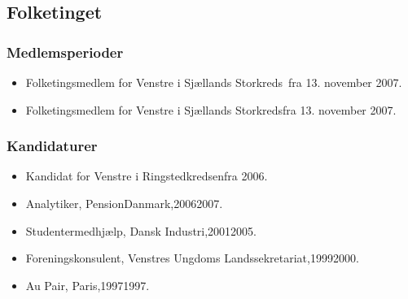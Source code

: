 \documentclass[11pt, a4paper]{awesome-cv}
\begin{document}
\begin{cvletter}
\subsection*{Folketinget}
\subsubsection*{Medlemsperioder}
\begin{itemize}
\item Folketingsmedlem for Venstre i Sjællands Storkreds fra 13. november 2007.
\item Folketingsmedlem for Venstre i Sjællands Storkredsfra 13. november 2007.
\end{itemize}
\subsubsection*{Kandidaturer}
\begin{itemize}
\item Kandidat for Venstre i Ringstedkredsenfra 2006.
\end{itemize}
\begin{itemize}
\item Analytiker, PensionDanmark,20062007.
\item Studentermedhjælp, Dansk Industri,20012005.
\item Foreningskonsulent, Venstres Ungdoms Landssekretariat,19992000.
\item Au Pair, Paris,19971997.
\end{itemize}
\end{cvletter}
\end{document}
